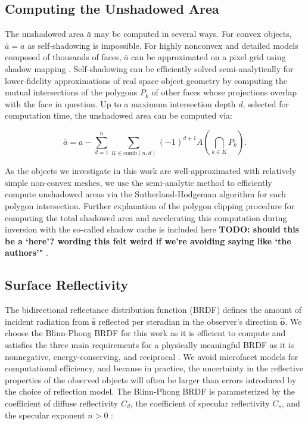 \documentclass[a4paper,twocolumn]{spaceDebrisC} %
\newcommand{\vctr}[1]{\bm{#1}}
\newcommand{\unitv}[1]{\hat{\vctr{#1}}}
\begin{document}
\subsection{Computing the Unshadowed Area}

The unshadowed area $\bar{a}$ may be computed in several ways. For convex objects, $\bar{a}=a$ as self-shadowing is impossible. For highly nonconvex and detailed models composed of thousands of faces, $\bar{a}$ can be approximated on a pixel grid using shadow mapping \cite{robinson2022}. Self-shadowing can be efficiently solved semi-analytically for lower-fidelity approximations of real space object geometry by computing the mutual intersections of the polygons $P_k$ of other faces whose projections overlap with the face in question. Up to a maximum intersection depth $d$, selected for computation time, the unshadowed area can be computed via:

\begin{equation} \label{eq:us_area}
 \bar{a} = a - \sum_{d=1}^{n} \sum_{K \in \text{comb}(n,d)} (-1)^{d+1} A\left(\bigcap\limits_{k \in K} P_k\right).
\end{equation}

As the objects we investigate in this work are well-approximated with relatively simple non-convex meshes, we use the semi-analytic method to efficiently compute unshadowed areas via the Sutherland-Hodgeman algorithm \cite{sutherland1974} for each polygon intersection. Further explanation of the polygon clipping procedure for computing the total shadowed area and accelerating this computation during inversion with the so-called shadow cache is included here \textbf{TODO: should this be a `here'? wording this felt weird if we're avoiding saying like `the authors'"} \cite{robinson2025att}.

\subsection{Surface Reflectivity}

The bidirectional reflectance distribution function (BRDF) defines the amount of incident radiation from $\unitv{s}$ reflected per steradian in the observer's direction $\unitv{o}$. We choose the Blinn-Phong \cite{blinn1977} BRDF for this work as it is efficient to compute and satisfies the three main requirements for a physically meaningful BRDF as it is nonnegative, energy-conserving, and reciprocal \cite{duvenhage2013}. We avoid microfacet models for computational efficiency, and because in practice, the uncertainty in the reflective properties of the observed objects will often be larger than errors introduced by the choice of reflection model. The Blinn-Phong BRDF is parameterized by the coefficient of diffuse reflectivity $C_d$, the coefficient of specular reflectivity $C_s$, and the specular exponent $n>0$ \cite{duvenhage2013}:
\end{document}
